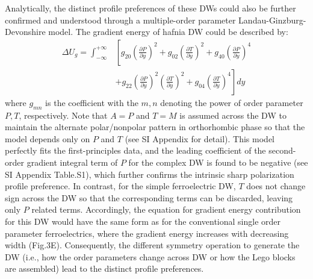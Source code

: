\documentclass[12pt]{article}
\begin{document}
Analytically, the distinct profile preferences of these DWs could also be further confirmed and understood through a multiple-order parameter Landau-Ginzburg-Devonshire model. 
The gradient energy of hafnia DW could be described by:
\begin{align*}
\Delta U_{g} = \int_{-\infty}^{+\infty} & \left[ g_{20}{\left(\frac{\partial P}{\partial y} \right)}^2 + g_{02}{\left(\frac{\partial T}{\partial y} \right)}^2 +g_{40}{\left(\frac{\partial P}{\partial y} \right)}^4\right. \\
&\left.+g_{22}{\left(\frac{\partial P}{\partial y} \right)}^2{\left(\frac{\partial T}{\partial y} \right)}^2+g_{04}{\left(\frac{\partial T}{\partial y} \right)}^4\right] dy
\end{align*}
where $g_{mn}$ is the coefficient with the $m,n$ denoting the power of order parameter $P,T$, respectively. Note that $A=P$ and $T=M$ is assumed across the DW to maintain the alternate polar/nonpolar pattern in orthorhombic phase so that the model depends only on $P$ and $T$ (see SI Appendix for detail).
This model perfectly fits the first-principles data, and the leading coefficient of the second-order gradient integral term of $P$ for the complex DW is found to be negative (see SI Appendix Table.S1), which further confirms the intrinsic sharp polarization profile preference.
In contrast, for the simple ferroelectric DW, $T$ does not change sign across the DW so that the corresponding terms can be discarded, leaving only $P$ related terms.
Accordingly, the equation for gradient energy contribution for this DW would have the same form as for the conventional single order parameter ferroelectrics, where the gradient energy increases with decreasing width (Fig.3E).
Consequently, the different symmetry operation to generate the DW (i.e., how the order parameters change across DW or how the Lego blocks are assembled) lead to the distinct profile preferences.
\end{document}
